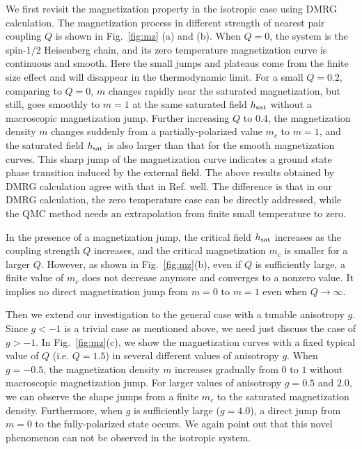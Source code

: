 \documentclass[article,10pt,onecolumn,superscriptaddress,floatfix]{revtex4}
\begin{document}
We first revisit the magnetization property in the isotropic case using DMRG calculation. The magnetization process in different strength of nearest pair coupling $Q$ is shown in Fig.~\ref{fig:mz} (a) and (b).
When $Q=0$, the system is the spin-1/2 Heisenberg chain, and its zero temperature magnetization curve is continuous and smooth. Here the small jumps and plateaus come from the finite size effect and will disappear in the thermodynamic limit. For a small $Q=0.2$, comparing to $Q=0$, $m$ changes rapidly near the saturated magnetization, but still, goes smoothly to $m=1$ at the same saturated field $h_{\rm sat}$ without a macroscopic magnetization jump. Further increasing $Q$ to $0.4$, the magnetization density $m$ changes suddenly from a partially-polarized value $m_c$ to $m=1$, and the saturated field $h_{\rm sat}$ is also larger than that for the smooth magnetization curves. This sharp jump of the magnetization curve indicates a ground state phase transition induced by the external field. The above results obtained by DMRG calculation agree with that in Ref.\cite{Adam2016} well. The difference is that in our DMRG calculation, the zero temperature case can be directly addressed, while the QMC method needs an extrapolation from finite small temperature to zero.

In the presence of a magnetization jump, the critical field $h_{\rm sat}$ increases as the coupling strength $Q$ increases, and the critical magnetization $m_c$ is smaller for a larger $Q$. However, as shown in Fig.~\ref{fig:mz}(b), even if $Q$ is sufficiently large, a finite value of $m_c$ does not decrease anymore and converges to a nonzero value. It implies no direct magnetization jump from $m=0$ to $m=1$ even when $Q\rightarrow\infty$.

Then we extend our investigation to the general case with a tunable anisotropy $g$.
Since $g < -1$ is a trivial case as mentioned above, we need just discuss the case of $g > -1$.
In Fig.~\ref{fig:mz}(c), we show the magnetization curves with a fixed typical value of $Q$ (i.e. $Q = 1.5$) in several different values of anisotropy $g$. When $g=-0.5$, the magnetization density $m$ increases gradually from $0$ to $1$ without macroscopic magnetization jump. For larger values of anisotropy $g=0.5$ and $2.0$, we can observe the shape jumps from a finite $m_c$ to the saturated magnetization density. Furthermore, when $g$ is sufficiently large ($g=4.0$), a direct jump from $m=0$ to the fully-polarized state occurs. We again point out that this novel phenomenon can not be observed in the isotropic system.
\end{document}
